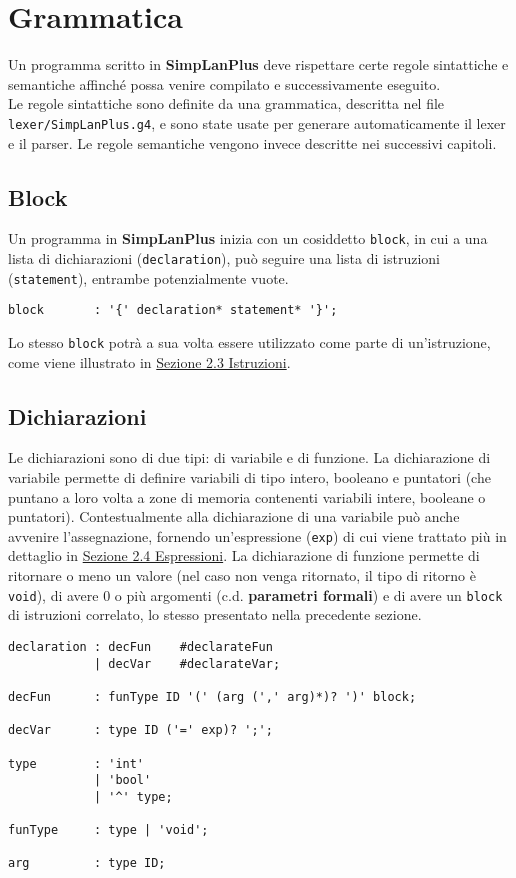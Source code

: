 \documentclass[../report.tex]{subfiles}
\begin{document}
\chapter{Grammatica}\label{c:grammatica}
Un programma scritto in \textbf{SimpLanPlus} deve rispettare certe regole sintattiche e semantiche affinché possa venire compilato e successivamente eseguito.\\
\noindent
Le regole sintattiche sono definite da una grammatica, descritta nel file \verb|lexer/SimpLanPlus.g4|, e sono state usate per generare automaticamente il lexer e il parser. Le regole semantiche vengono invece descritte nei successivi capitoli.

\section{Block}\label{s:block}
Un programma in \textbf{SimpLanPlus} inizia con un cosiddetto \verb|block|, in cui a una lista di dichiarazioni (\verb|declaration|), può seguire una lista di istruzioni (\verb|statement|), entrambe potenzialmente vuote.
\begin{lstlisting}[style=antlr]
block       : '{' declaration* statement* '}';
\end{lstlisting}
Lo stesso \verb|block| potrà a sua volta essere utilizzato come parte di un'istruzione, come viene illustrato in \hyperref[s:istruzioni]{Sezione 2.3 Istruzioni}.

\section{Dichiarazioni}\label{s:dichiarazioni}
Le dichiarazioni sono di due tipi: di variabile e di funzione. La dichiarazione di variabile permette di definire variabili di tipo intero, booleano e puntatori (che puntano a loro volta a zone di memoria contenenti variabili intere, booleane o puntatori). Contestualmente alla dichiarazione di una variabile può anche avvenire l'assegnazione, fornendo un'espressione (\verb|exp|) di cui viene trattato più in dettaglio in \hyperref[s:espressioni]{Sezione 2.4 Espressioni}.
La dichiarazione di funzione permette di ritornare o meno un valore (nel caso non venga ritornato, il tipo di ritorno è \verb|void|), di avere 0 o più argomenti (c.d. \textbf{parametri formali}) e di avere un \verb|block| di istruzioni correlato, lo stesso presentato nella precedente sezione.
\begin{lstlisting}[style=antlr]
declaration : decFun    #declarateFun
            | decVar    #declarateVar;

decFun      : funType ID '(' (arg (',' arg)*)? ')' block;

decVar      : type ID ('=' exp)? ';';

type        : 'int'
            | 'bool'
            | '^' type;

funType     : type | 'void';

arg         : type ID;
\end{lstlisting}
\end{document}
